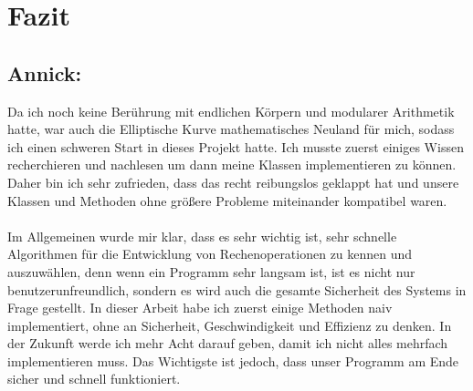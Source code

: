 \chapter{Fazit}

\section*{Annick:}
Da ich noch keine Berührung mit endlichen Körpern und modularer Arithmetik hatte, war auch die Elliptische Kurve mathematisches Neuland für mich, sodass ich einen schweren Start in dieses Projekt hatte. Ich musste zuerst einiges Wissen recherchieren und nachlesen um dann meine Klassen implementieren zu können. Daher bin ich sehr zufrieden, dass das recht reibungslos geklappt hat und unsere Klassen und Methoden ohne größere Probleme miteinander kompatibel waren. \\
\\
Im Allgemeinen wurde mir klar, dass es sehr wichtig ist, sehr schnelle Algorithmen für die Entwicklung von Rechenoperationen zu kennen und auszuwählen, denn wenn ein Programm sehr langsam ist, ist es nicht nur benutzerunfreundlich, sondern es wird auch die gesamte Sicherheit des Systems in Frage gestellt. In dieser Arbeit habe ich zuerst einige Methoden naiv implementiert, ohne an Sicherheit, Geschwindigkeit und Effizienz zu denken. In der Zukunft werde ich mehr Acht darauf geben, damit ich nicht alles mehrfach implementieren muss. Das Wichtigste ist jedoch, dass unser Programm am Ende sicher und schnell funktioniert.



